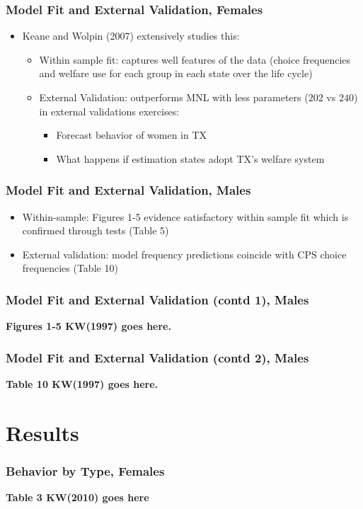 \begin{frame}
	\frametitle{Model Fit and External Validation, Females}
		\begin{itemize}
			\item Keane and Wolpin (2007) extensively studies this:
				\begin{itemize}
					\item Within sample fit: captures well features of the data (choice frequencies and welfare use for each group in each state over the life cycle)
					\item External Validation: outperforms MNL with less parameters ($202$ vs $240$) in external validations exercises: 
					\begin{itemize}
						\item Forecast behavior of women in TX
						\item What happens if estimation states adopt TX's welfare system
					\end{itemize}
				\end{itemize}
		\end{itemize}				
\end{frame}

\begin{frame}
	\frametitle{Model Fit and External Validation, Males}
		\begin{itemize}
			\item Within-sample: Figures 1-5 evidence satisfactory within sample fit which is confirmed through tests (Table 5)
			\item External validation: model frequency predictions coincide with CPS choice frequencies (Table 10)
		\end{itemize}
\end{frame}

\begin{frame}
	\frametitle{Model Fit and External Validation (contd 1), Males}
	\textbf{Figures 1-5 KW(1997) goes here.}
\end{frame}

\begin{frame}
	\frametitle{Model Fit and External Validation (contd 2), Males}
	\textbf{Table 10 KW(1997) goes here.}
\end{frame}

\section{Results}
\begin{frame}
	\frametitle{Behavior by Type, Females}
	\textbf{Table 3 KW(2010) goes here}	
\end{frame}

